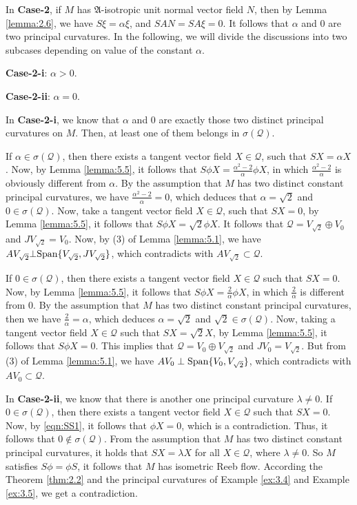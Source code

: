 \documentclass[reqno]{amsart}%
\theoremstyle{definition}
\numberwithin{equation}{section}
\begin{document}
In {\bf Case-2}, if $M$ has $\mathfrak{A}$-isotropic unit normal vector field $N$, then by Lemma \ref{lemma:2.6}, we have $S\xi=\alpha\xi$, and $SAN=SA\xi=0$. It follows that $\alpha$ and $0$ are two principal curvatures. In the following, we will divide the discussions into two subcases depending on value of the constant $\alpha$.

{\bf Case-2-i}: $\alpha>0$.

{\bf Case-2-ii}: $\alpha=0$.

In {\bf Case-2-i}, we know that $\alpha$ and $0$ are exactly those two distinct principal curvatures on $M$.
Then, at least one of them belongs in $\sigma(\mathcal{Q})$.

If $\alpha\in\sigma(\mathcal{Q})$, then there exists a tangent vector field $X\in\mathcal{Q}$, such that
$SX=\alpha X$. Now, by Lemma \ref{lemma:5.5}, it follows that $S\phi X=\tfrac{\alpha^2-2}{\alpha}\phi X$, in which $\tfrac{\alpha^2-2}{\alpha}$ is obviously different from $\alpha$. By the assumption
that $M$ has two distinct constant principal curvatures, we have $\tfrac{\alpha^2-2}{\alpha}=0$,
which deduces that $\alpha=\sqrt{2}$ and $0\in\sigma(\mathcal{Q})$. Now, take a tangent vector field $X\in\mathcal{Q}$, such that $SX=0$, by Lemma \ref{lemma:5.5}, it follows that $S\phi X=\sqrt{2}\phi X$.
It follows that $\mathcal{Q}=V_{\sqrt{2}}\oplus V_0$ and
$J V_{\sqrt{2}}=V_0$. Now, by (3) of Lemma \ref{lemma:5.1}, we have
$AV_{\sqrt{2}}\bot{\rm Span}\{V_{\sqrt{2}},JV_{\sqrt{2}}\}$, which contradicts with $AV_{\sqrt{2}}\subset\mathcal{Q}$.

If $0\in\sigma(\mathcal{Q})$, then there exists a tangent vector field $X\in\mathcal{Q}$ such that
$SX=0$. Now, by Lemma \ref{lemma:5.5}, it follows that $S\phi X=\tfrac{2}{\alpha}\phi X$, in which $\tfrac{2}{\alpha}$ is different from $0$. By the assumption that $M$ has two distinct constant principal curvatures, then we have $\tfrac{2}{\alpha}=\alpha$,
which deduces $\alpha=\sqrt{2}$ and $\sqrt{2}\in\sigma(\mathcal{Q})$. Now, taking a tangent vector field $X\in\mathcal{Q}$ such that $SX=\sqrt{2} X$, by Lemma \ref{lemma:5.5}, it follows that $S\phi X=0$.
This implies that $\mathcal{Q}=V_0\oplus V_{\sqrt{2}}$ and $JV_0=V_{\sqrt{2}}$.
But from (3) of Lemma \ref{lemma:5.1}, we have $AV_0\perp {\rm Span}\{V_0,V_{\sqrt{2}}\}$,
which contradicts with $AV_0\subset \mathcal{Q}$.

In {\bf Case-2-ii}, we know that there is another one principal curvature $\lambda\neq0$. If $0\in\sigma(\mathcal{Q})$, then there exists a tangent vector field $X\in\mathcal{Q}$ such that
$SX=0$. Now, by \eqref{eqn:SS1}, it follows that $\phi X=0$,
which is a contradiction. Thus, it follows that $0\notin\sigma(\mathcal{Q})$.
From the assumption that $M$ has two distinct constant principal curvatures,
it holds that
$SX=\lambda X$ for all $X\in\mathcal{Q}$, where $\lambda\neq0$. So $M$ satisfies $S\phi=\phi S$, it follows that $M$ has isometric Reeb flow. According the Theorem \ref{thm:2.2} and the principal curvatures of Example \ref{ex:3.4} and Example \ref{ex:3.5}, we get a contradiction.
\end{document}
